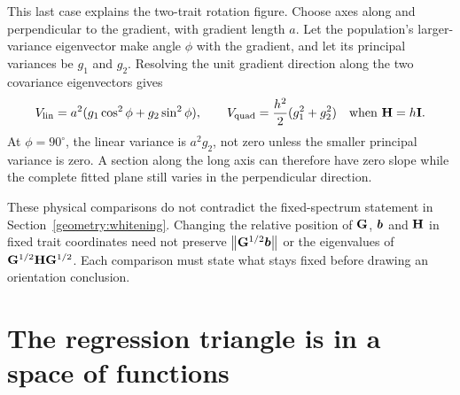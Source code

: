 This last case explains the two-trait rotation figure. Choose axes along
and perpendicular to the gradient, with gradient length $a$. Let the
population's larger-variance eigenvector make angle $\phi$ with the
gradient, and let its principal variances be $g_1$ and $g_2$. Resolving the
unit gradient direction along the two covariance eigenvectors gives
\begin{equation}
V_{\mathrm{lin}}=a^2(g_1\cos^2\phi+g_2\sin^2\phi),
\qquad
V_{\mathrm{quad}}=\frac{h^2}{2}(g_1^2+g_2^2)
\quad\text{when }\mathbf{H}=h\mathbf{I}.
\label{geometry:rotation_formula}
\end{equation}
At $\phi=90^\circ$, the linear variance is $a^2g_2$, not zero unless
the smaller principal variance is zero. A section along the long axis
can therefore have zero slope while the complete fitted plane still
varies in the perpendicular direction.

These physical comparisons do not contradict the fixed-spectrum statement
in Section~\ref{geometry:whitening}. Changing the relative position of
$\mathbf{G}$, $\boldsymbol{b}$ and $\mathbf{H}$ in fixed trait coordinates need not
preserve $\left\lVert \mathbf{G}^{1/2}\boldsymbol{b}\right\rVert$ or the eigenvalues of
$\mathbf{G}^{1/2}\mathbf{H}\mathbf{G}^{1/2}$. Each comparison must state what stays
fixed before drawing an orientation conclusion.

\section{The regression triangle is in a space of functions}
\label{geometry:projection_triangle}

